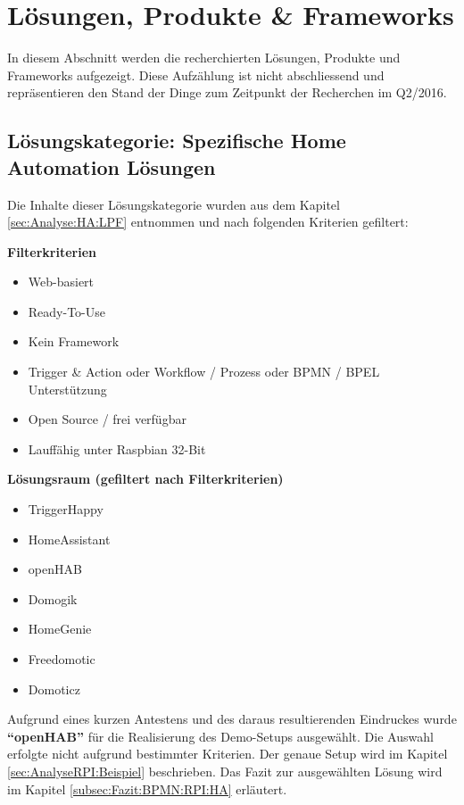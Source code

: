\section{Lösungen, Produkte \& Frameworks }
In diesem Abschnitt werden die recherchierten Lösungen, Produkte und Frameworks aufgezeigt. Diese Aufzählung ist nicht abschliessend und repräsentieren den Stand der Dinge zum Zeitpunkt der Recherchen im Q2/2016.

\subsection{Lösungskategorie: Spezifische Home Automation Lösungen}
Die Inhalte dieser Lösungskategorie wurden aus dem Kapitel \ref{sec:Analyse:HA:LPF}  entnommen und nach folgenden Kriterien gefiltert:

\textbf{Filterkriterien}
\begin{itemize}
\item Web-basiert
\item Ready-To-Use
\item Kein Framework
\item Trigger \& Action oder Workflow  / Prozess oder BPMN / BPEL Unterstützung
\item Open Source / frei verfügbar
\item Lauffähig unter Raspbian 32-Bit
\end{itemize}

\textbf{Lösungsraum (gefiltert nach Filterkriterien)}
\begin{itemize}
\item TriggerHappy
\item HomeAssistant
\item openHAB
\item Domogik
\item HomeGenie
\item Freedomotic
\item Domoticz
\end{itemize}

Aufgrund eines kurzen Antestens und des daraus resultierenden Eindruckes wurde \textbf{"`openHAB"'} für die Realisierung des Demo-Setups ausgewählt. Die Auswahl erfolgte nicht aufgrund bestimmter Kriterien. Der genaue Setup wird im Kapitel \ref{sec:AnalyseRPI:Beispiel}  beschrieben. Das Fazit zur ausgewählten Lösung wird im Kapitel \ref{subsec:Fazit:BPMN:RPI:HA}  erläutert.


